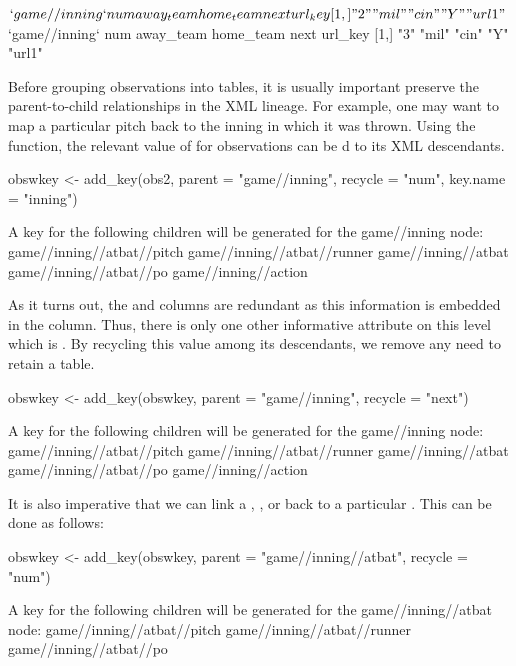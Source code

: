 \begin{article}
\begin{Schunk}
\begin{Soutput}
$`game//inning`
     num away_team home_team next url_key
[1,] "2" "mil"     "cin"     "Y"  "url1" 

$`game//inning`
     num away_team home_team next url_key
[1,] "3" "mil"     "cin"     "Y"  "url1" 
\end{Soutput}
\end{Schunk}
%
Before grouping observations into tables, it is usually important
preserve the parent-to-child relationships in the XML lineage. For
example, one may want to map a particular pitch back to the inning
in which it was thrown. Using the  function, the relevant
value of  for  observations can be
d to its XML descendants.
%
\begin{Schunk}
\begin{Sinput}
obswkey <- add_key(obs2, parent = "game//inning", recycle = "num", key.name = "inning")
\end{Sinput}
\begin{Soutput}
A key for the following children will be generated for the game//inning node:
game//inning//atbat//pitch
game//inning//atbat//runner
game//inning//atbat
game//inning//atbat//po
game//inning//action
\end{Soutput}
\end{Schunk}
%
As it turns out, the  and  columns
are redundant as this information is embedded in the  column.
Thus, there is only one other informative attribute on this level
which is . By recycling this value among its descendants,
we remove any need to retain a  table.
%
\begin{Schunk}
\begin{Sinput}
obswkey <- add_key(obswkey, parent = "game//inning", recycle = "next")
\end{Sinput}
\begin{Soutput}
A key for the following children will be generated for the game//inning node:
game//inning//atbat//pitch
game//inning//atbat//runner
game//inning//atbat
game//inning//atbat//po
game//inning//action
\end{Soutput}
\end{Schunk}
%
It is also imperative that we can link a , ,
or  back to a particular . This can be done
as follows:
%
\begin{Schunk}
\begin{Sinput}
obswkey <- add_key(obswkey, parent = "game//inning//atbat", recycle = "num")
\end{Sinput}
\begin{Soutput}
A key for the following children will be generated for the game//inning//atbat node:
game//inning//atbat//pitch
game//inning//atbat//runner
game//inning//atbat//po
\end{Soutput}
\end{Schunk}
%


\end{article}
